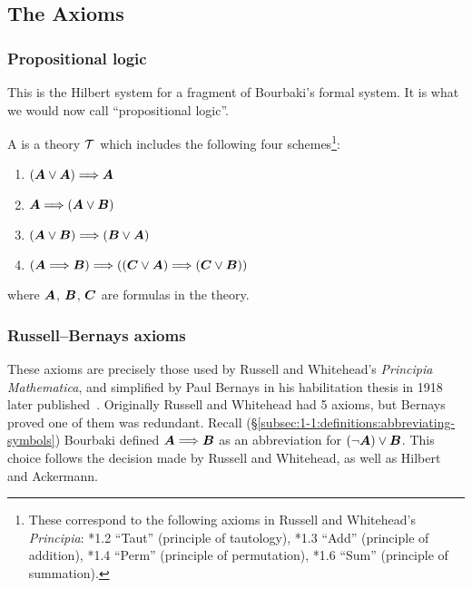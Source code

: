 \subsection{The Axioms}
\setcounter{subsubsection}{-1}
\subsubsection{Propositional logic} This is the Hilbert system for
a fragment of Bourbaki's formal system. It is what we would now call
``propositional logic''.

\begin{definition}
A  is a theory $\mathcal{T}$ which includes the
following four schemes\footnote{These correspond to the following
axioms in Russell and Whitehead's \emph{Principia}:
*1.2 ``Taut'' (principle of tautology),
*1.3 ``Add'' (principle of addition),
*1.4 ``Perm'' (principle of permutation),
*1.6 ``Sum'' (principle of summation).}:
\begin{enumerate}[label=(S\arabic*),ref={S\arabic*}]
\item\label{axiom:s1} $(\boldsymbol{A}\lor\boldsymbol{A})\Longrightarrow\boldsymbol{A}$
\item\label{axiom:s2} $\boldsymbol{A}\Longrightarrow(\boldsymbol{A}\lor\boldsymbol{B})$
\item\label{axiom:s3} $(\boldsymbol{A}\lor\boldsymbol{B})\Longrightarrow(\boldsymbol{B}\lor\boldsymbol{A})$
\item\label{axiom:s4} $(\boldsymbol{A}\Longrightarrow\boldsymbol{B})\Longrightarrow((\boldsymbol{C}\lor\boldsymbol{A})\Longrightarrow(\boldsymbol{C}\lor\boldsymbol{B}))$
\end{enumerate}
where $\boldsymbol{A}$, $\boldsymbol{B}$, $\boldsymbol{C}$
are formulas in the theory.
\end{definition}

\subsubsection{Russell--Bernays axioms}
These axioms are precisely those used by Russell and Whitehead's
\textit{Principia Mathematica}, and simplified by Paul
Bernays in his habilitation thesis in 1918 later
published~\cite{bernays1926}. Originally Russell and Whitehead had 5
axioms, but Bernays proved one of them was redundant.
Recall (\S\ref{subsec:1-1:definitions:abbreviating-symbols})
Bourbaki defined $\boldsymbol{A}\Longrightarrow\boldsymbol{B}$ as an
abbreviation for $(\neg\boldsymbol{A})\lor\boldsymbol{B}$. This
choice follows the decision made by Russell and Whitehead, as well as
Hilbert and Ackermann.

